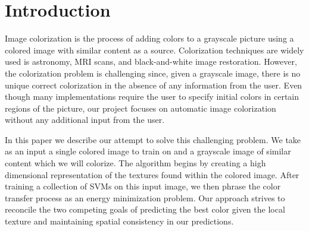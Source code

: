 \section{Introduction}
\label{sec:intro}

Image colorization is the process of adding colors to a grayscale picture using a colored image with similar content as a source. Colorization techniques are widely used is astronomy, MRI scans, and  black-and-white image restoration. However, the colorization problem is challenging since, given a grayscale image, there is no unique correct colorization in the absence of any information from the user. Even though many implementations require the user to specify initial colors in certain regions of the picture, our project focuses on automatic image colorization without any additional input from the user.

In this paper we describe our attempt to solve this challenging problem.  We take as an input a single colored image to train on and a grayscale image of similar content which we will colorize.  The algorithm begins by creating a high dimensional representation of the textures found within the colored image.  After training a collection of SVMs on this input image, we then phrase the color transfer process as an energy minimization problem.  Our approach strives to reconcile the two competing goals of predicting the best color given the local texture and maintaining spatial consistency in our predictions.
